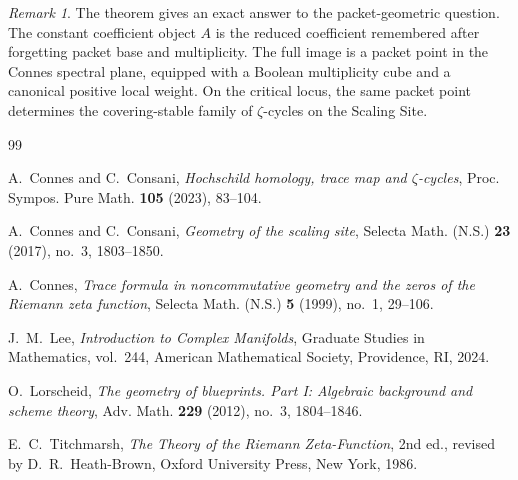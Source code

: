 \documentclass[11pt,a4paper]{article}
\theoremstyle{definition}
\theoremstyle{remark}
\newtheorem{remark}[theorem]{Remark}
\begin{document}
\begin{remark}
The theorem gives an exact answer to the packet-geometric question.  The constant coefficient object $A$ is the reduced coefficient remembered after forgetting packet base and multiplicity.  The full image is a packet point in the Connes spectral plane, equipped with a Boolean multiplicity cube and a canonical positive local weight.  On the critical locus, the same packet point determines the covering-stable family of $\zeta$-cycles on the Scaling Site.
\end{remark}

\begin{thebibliography}{99}

A.~Connes and C.~Consani,
\emph{Hochschild homology, trace map and $\zeta$-cycles},
Proc. Sympos. Pure Math. \textbf{105} (2023), 83--104.

A.~Connes and C.~Consani,
\emph{Geometry of the scaling site},
Selecta Math. (N.S.) \textbf{23} (2017), no.~3, 1803--1850.

A.~Connes,
\emph{Trace formula in noncommutative geometry and the zeros of the Riemann zeta function},
Selecta Math. (N.S.) \textbf{5} (1999), no.~1, 29--106.

J.~M.~Lee,
\emph{Introduction to Complex Manifolds},
Graduate Studies in Mathematics, vol.~244, American Mathematical Society, Providence, RI, 2024.

O.~Lorscheid,
\emph{The geometry of blueprints. Part I: Algebraic background and scheme theory},
Adv. Math. \textbf{229} (2012), no.~3, 1804--1846.

E.~C.~Titchmarsh,
\emph{The Theory of the Riemann Zeta-Function},
2nd ed., revised by D.~R.~Heath-Brown, Oxford University Press, New York, 1986.

\end{thebibliography}
\end{document}

